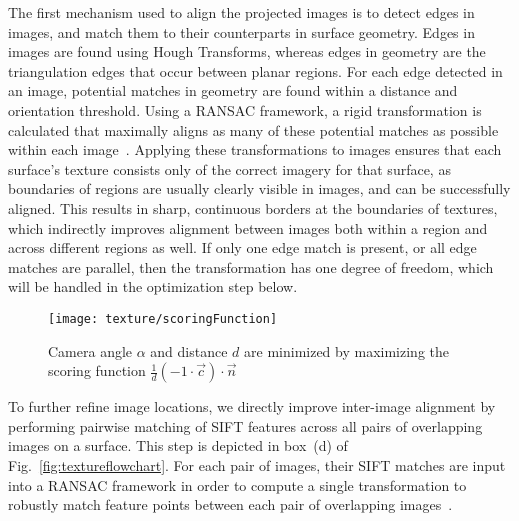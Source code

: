 \documentclass[10pt,twocolumn,twoside]{IEEEtran}
\begin{document}
The first mechanism used to align the projected images is to detect edges in images, and match them to their counterparts in surface geometry. Edges in images are found using Hough Transforms, whereas edges in geometry are the triangulation edges that occur between planar regions. For each edge detected in an image, potential matches in geometry are found within a distance and orientation threshold. Using a RANSAC framework, a rigid transformation is calculated that maximally aligns as many of these potential matches as possible within each image~\cite{Cheng14,fischler1981random,linebased,rectangularstructures}.  Applying these transformations to images ensures that each surface's texture consists only of the correct imagery for that surface, as boundaries of regions are usually clearly visible in images, and can be successfully aligned. This results in sharp, continuous borders at the boundaries of textures, which indirectly improves alignment between images both within a region and across different regions as well.  If only one edge match is present, or all edge matches are parallel, then the transformation has one degree of freedom, which will be handled in the optimization step below.

\begin{figure}
  \begin{minipage}[b]{0.9\linewidth}
    \centering
    \texttt{[image: texture/scoringFunction]}
    \caption{Camera angle $\alpha$ and distance $d$ are minimized by
      maximizing the scoring function $\frac{1}{d} (-1 \cdot \vec{c})
      \cdot \vec{n}$}
    \label{fig:scoringFunction}
  \end{minipage}
\end{figure}


To further refine image locations, we directly improve inter-image alignment by performing pairwise matching of SIFT features across all pairs of overlapping images on a surface. This step is depicted in box~(d) of Fig.~\ref{fig:textureflowchart}.  For each pair of images, their SIFT matches are input into a RANSAC framework in order to compute a single transformation to robustly match feature points between each pair of overlapping images~\cite{siftgpu,fischler1981random}.
\end{document}
